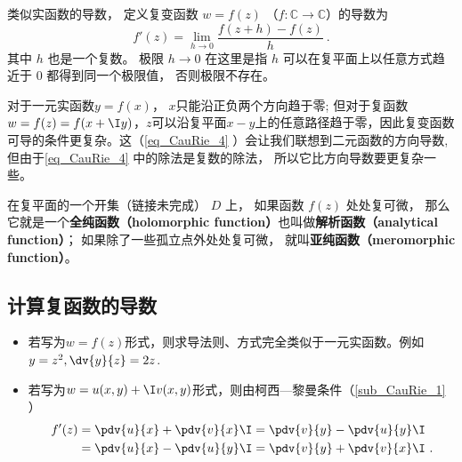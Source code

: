 
\begin{issues}
\issueTODO
\end{issues}


\begin{definition}{}
类似实函数的导数， 定义复变函数 $w = f(z)$ （$f:\mathbb C\to \mathbb C$）的导数为
\begin{equation}\label{eq_CauRie_4}
f'(z) = \lim_{h\to 0} \frac{f(z + h) - f(z)}{h}~.
\end{equation}
其中 $h$ 也是一个复数。 极限 $h \to 0$ 在这里是指 $h$ 可以在复平面上以任意方式趋近于 $0$ 都得到同一个极限值， 否则极限不存在。
\end{definition}

对于一元实函数$y=f(x)$， $x$只能沿正负两个方向趋于零; 但对于复函数$w=f(z)=f(x+\I y)$，$z$可以沿复平面$x-y$上的任意路径趋于零，因此复变函数可导的条件更复杂。这（\autoref{eq_CauRie_4} ）会让我们联想到二元函数的方向导数, 但由于\autoref{eq_CauRie_4} 中的除法是复数的除法， 所以它比方向导数要更复杂一些。

在复平面的一个开集（链接未完成） $D$ 上， 如果函数 $f(z)$ 处处复可微， 那么它就是一个\textbf{全纯函数（holomorphic function）}也叫做\textbf{解析函数（analytical function）}； 如果除了一些孤立点外处处复可微， 就叫\textbf{亚纯函数（meromorphic function）}。

\subsection{计算复函数的导数}
\begin{itemize}
\item 若写为$w=f(z)$形式，则求导法则、方式完全类似于一元实函数。例如$y=z^2, \dv{y}{z}=2z$.
\item 若写为$w=u(x,y)+\I v(x,y)$形式，则由柯西—黎曼条件（\autoref{sub_CauRie_1} ）
\begin{equation}
\begin{aligned}
f'(z) &= \pdv{u}{x} + \pdv{v}{x}\I = \pdv{v}{y} -\pdv{u}{y} \I\\
&= \pdv{u}{x} -\pdv{u}{y} \I = \pdv{v}{y} + \pdv{v}{x}\I~.
\end{aligned}
\end{equation}
\end{itemize}

